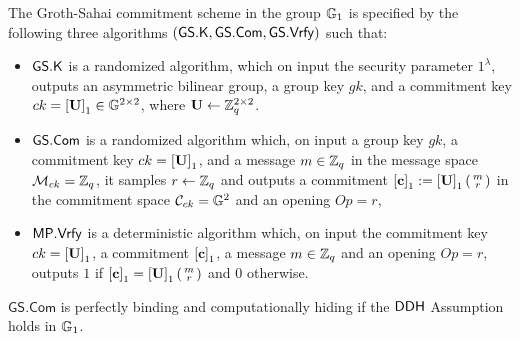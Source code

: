 \begin{definition} The Groth-Sahai commitment scheme in the group $\mathbb{G}_1$ is  specified by the following three algorithms 
	$(\mathsf{GS}.\mathsf{K},\mathsf{GS}.\mathsf{Com},\mathsf{GS}.\mathsf{Vrfy})$ such that:
	\begin{itemize} 
		\item  $\mathsf{GS}.\mathsf{K}$ is a randomized algorithm, which on input the security parameter 
		$1^{\lambda}$, outputs an asymmetric bilinear group, a group key $gk$, and a commitment key $ck=\left[\mathbf{{U}}\right]_1 \in \mathbb{G}^{2\times 2}$, where $\mathbf{{U}}\gets\mathbb{Z}_q^{2\times 2}$.
		\item $\mathsf{GS}.\mathsf{Com}$ is a randomized algorithm which, on input a group key $gk$, a commitment key $ck=\left[\mathbf{{U}}\right]_1$, and a message 
		$m \in \mathbb{Z}_q$ in the message space $\mathcal{M}_{ck}=\mathbb{Z}_q$, it samples $r \gets \mathbb{Z}_q$ and outputs a commitment $\left[\mathbf{c}\right]_1 := \left[\mathbf{{U}}\right]_1\left(\begin{smallmatrix}m\\r\end{smallmatrix}\right)$ in the commitment space $\mathcal{C}_{ck}=\mathbb{G}^2$ and an opening $Op=r$, 
		\item $\mathsf{MP}.\mathsf{Vrfy}$ is a deterministic algorithm which, on input the commitment key $ck=\left[\mathbf{{U}}\right]_1$, a commitment $\left[\mathbf{c}\right]_1$,  a message 
		$m \in \mathbb{Z}_q$ and an opening $Op=r$, outputs $1$ if $\left[\mathbf{c}\right]_1=\left[\mathbf{{U}}\right]_1\left(\begin{smallmatrix}m \\ r\end{smallmatrix}\right)$
		and $0$ otherwise.
	\end{itemize}
\end{definition}

\begin{theorem} $\mathsf{GS}.\mathsf{Com}$ is perfectly binding and computationally hiding if the $\mathsf{DDH}$ Assumption holds in $\mathbb{G}_1$.
\end{theorem}
